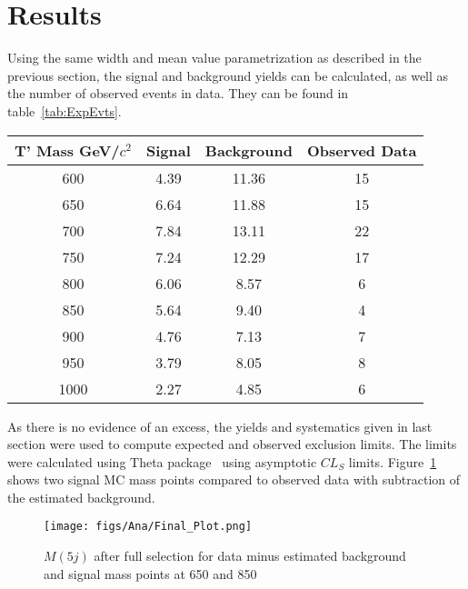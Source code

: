 \section{Results}
\label{sec:res}

Using the same width and mean value parametrization as described in the previous section, the signal and background yields can be calculated, as well as the number of observed events in data. They can be found in table~\ref{tab:ExpEvts}. 

\begin{table*}[htbH]
\begin{center}
\begin{tabular}{|c|c|c|c|}
\hline 
T' Mass GeV/$c^{2}$ & Signal & Background & Observed Data\\
\hline 
600 & 4.39 & 11.36 & 15 \\
650 & 6.64 & 11.88 & 15 \\
700 & 7.84 & 13.11 & 22 \\
750 & 7.24 & 12.29 & 17 \\
800 & 6.06 & 8.57 & 6 \\
850 & 5.64 & 9.40 & 4 \\
900 & 4.76 & 7.13 & 7 \\
950 & 3.79 & 8.05 & 8 \\
1000 & 2.27 & 4.85 & 6 \\
\hline
\end{tabular}
\caption{Expected number of events for the signal, estimated background and observed data after full selection \label{tab:ExpEvts}}
\end{center}
\end{table*}

As there is no evidence of an excess, the yields and systematics given in last section were used to compute expected and observed exclusion limits. The limits were calculated using Theta package~\cite{theta_web} using asymptotic $CL_{S}$ limits. Figure~\ref{fig:FinalPlot} shows two signal MC mass points compared to observed data with subtraction of the estimated background.

\begin{figure}[!Hhtbp]
  \begin{center}
    \texttt{[image: figs/Ana/Final\_Plot.png]}
    \caption{$M(5j)$ after full selection for data minus estimated background and signal mass points at 650 \GeVcc and 850 \GeVcc}
    \label{fig:FinalPlot}
  \end{center}
\end{figure}

